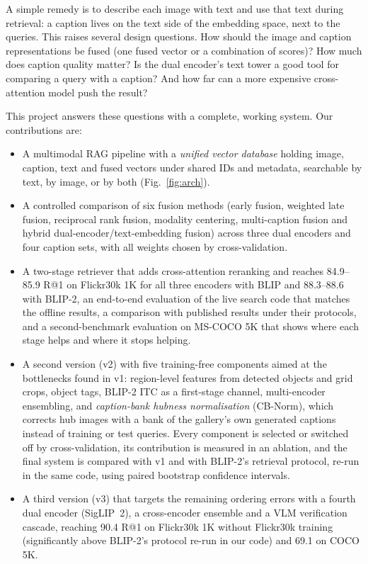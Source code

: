 \documentclass[conference]{IEEEtran}
\begin{document}
A simple remedy is to describe each image with text and use that text during retrieval: a caption lives on
the text side of the embedding space, next to the queries. This raises several design questions. How
should the image and caption representations be fused (one fused vector or a combination of scores)?
How much does caption quality matter? Is the dual encoder's text tower a good tool for comparing a query
with a caption? And how far can a more expensive cross-attention model push the result?

This project answers these questions with a complete, working system. Our contributions are:
\begin{itemize}
\item A multimodal RAG pipeline with a \emph{unified vector database} holding image, caption, text and
fused vectors under shared IDs and metadata, searchable by text, by image, or by both (Fig.~\ref{fig:arch}).
\item A controlled comparison of six fusion methods (early fusion, weighted late fusion, reciprocal rank
fusion, modality centering, multi-caption fusion and hybrid dual-encoder/text-embedding fusion) across three
dual encoders and four caption sets, with all weights chosen by cross-validation.
\item A two-stage retriever that adds cross-attention reranking and reaches 84.9--85.9 R@1 on Flickr30k 1K
for all three encoders with BLIP and 88.3--88.6 with BLIP-2, an end-to-end evaluation of the live search
code that matches the offline results, a comparison with published results under their protocols, and a
second-benchmark evaluation on MS-COCO 5K that shows where each stage helps and where it stops helping.
\item A second version (v2) with five training-free components aimed at the bottlenecks found in v1: region-level
features from detected objects and grid crops, object tags, BLIP-2 ITC as a first-stage channel, multi-encoder
ensembling, and \emph{caption-bank hubness normalisation} (CB-Norm), which corrects hub images with a bank of the
gallery's own generated captions instead of training or test queries. Every component is selected or switched off
by cross-validation, its contribution is measured in an ablation, and the final system is compared with v1 and with
BLIP-2's retrieval protocol, re-run in the same code, using paired bootstrap confidence intervals.
\item A third version (v3) that targets the remaining ordering errors with a fourth dual encoder (SigLIP~2), a
cross-encoder ensemble and a VLM verification cascade, reaching 90.4 R@1 on Flickr30k 1K without Flickr30k
training (significantly above BLIP-2's protocol re-run in our code) and 69.1 on COCO 5K.
\end{itemize}
\end{document}
